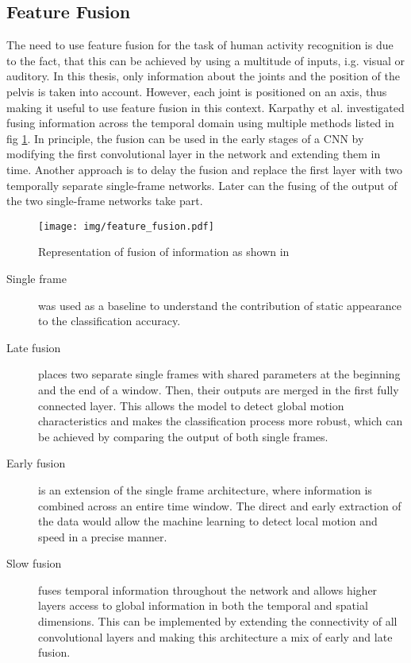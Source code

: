 		\subsection{Feature Fusion}\label{subsec:feature-fusion}
		The need to use feature fusion for the task of human activity recognition is due to the fact, that this can be achieved by using a multitude of inputs, i.g. visual or auditory. In this thesis, only information about the joints and the position of the pelvis is taken into account. However, each joint is positioned on an axis, thus making it useful to use feature fusion in this context. Karpathy et al. investigated fusing information across the temporal domain using multiple methods listed in fig \ref{fig:feature_fusion}. In principle, the fusion can be used in the early stages of a CNN by modifying the first convolutional layer in the network and extending them in time. Another approach is to delay the fusion and replace the first layer with two temporally separate single-frame networks. Later can the fusing of the output of the two single-frame networks take part\cite{karpathy2014large}.\newline
		\begin{figure}[H]
			\begin{center}
				\texttt{[image: img/feature\_fusion.pdf]}
				\caption{Representation of fusion of information as shown in \cite{karpathy2014large}}
				\label{fig:feature_fusion}
			\end{center}
		\end{figure}
		\begin{description}
			\item[Single frame] was used as a baseline to understand the contribution of static appearance to the classification accuracy\cite{karpathy2014large}.
			\item[Late fusion] places two separate single frames with shared parameters at the beginning and the end of a window. Then, their outputs are merged in the first fully connected layer. This allows the model to detect global motion characteristics and makes the classification process more robust, which can be achieved by comparing the output of both single frames\cite{karpathy2014large}.
			\item[Early fusion] is an extension of the single frame architecture, where information is combined across an entire time window. The direct and early extraction of the data would allow the machine learning to detect local motion and speed in a precise manner\cite{karpathy2014large}.
			\item[Slow fusion] fuses temporal information throughout the network and allows higher layers access to global information in both the temporal and spatial dimensions. This can be implemented by extending the connectivity of all convolutional layers and making this architecture a mix of early and late fusion\cite{karpathy2014large}.
		\end{description}

